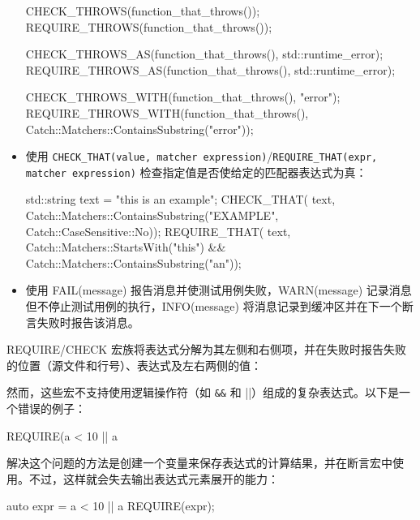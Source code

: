 \begin{itemize}
\begin{cpp}
{    CHECK_THROWS(function_that_throws());
    REQUIRE_THROWS(function_that_throws());

    CHECK_THROWS_AS(function_that_throws(), std::runtime_error);
    REQUIRE_THROWS_AS(function_that_throws(), std::runtime_error);

    CHECK_THROWS_WITH(function_that_throws(), "error");
    REQUIRE_THROWS_WITH(function_that_throws(),
    Catch::Matchers::ContainsSubstring("error"));
}
\end{cpp}

\item
使用 \verb|CHECK_THAT(value, matcher expression)|/\verb|REQUIRE_THAT(expr, matcher expression)| 检查指定值是否使给定的匹配器表达式为真：

\begin{cpp}
std::string text = "this is an example";
CHECK_THAT(
    text,
    Catch::Matchers::ContainsSubstring("EXAMPLE", Catch::CaseSensitive::No));
REQUIRE_THAT(
    text,
    Catch::Matchers::StartsWith("this") &&
    Catch::Matchers::ContainsSubstring("an"));
\end{cpp}

\item
使用 FAIL(message) 报告消息并使测试用例失败，WARN(message) 记录消息但不停止测试用例的执行，INFO(message) 将消息记录到缓冲区并在下一个断言失败时报告该消息。
\end{itemize}


REQUIRE/CHECK 宏族将表达式分解为其左侧和右侧项，并在失败时报告失败的位置（源文件和行号）、表达式及左右两侧的值：


然而，这些宏不支持使用逻辑操作符（如 \verb|&&| 和 ||）组成的复杂表达式。以下是一个错误的例子：

\begin{cpp}
REQUIRE(a < 10 || a %
\end{cpp}

解决这个问题的方法是创建一个变量来保存表达式的计算结果，并在断言宏中使用。不过，这样就会失去输出表达式元素展开的能力：

\begin{cpp}
auto expr = a < 10 || a %
REQUIRE(expr);
\end{cpp}

